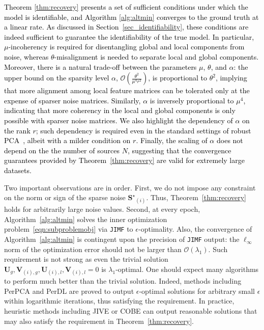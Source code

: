 \documentclass[twoside,11pt]{article}
\def\inneralg{\texttt{JIMF}\xspace}
\newcommand{\revise}[1]{\textcolor{black}{ #1}}
\newcommand{\matSst}{{\mathbf{S}^\star}}
\newcommand{\matU}{\mathbf{U}}
\newcommand{\matV}{\mathbf{V}}
\begin{document}
\revise{Theorem \ref{thm:recovery} presents a set of sufficient conditions under which the model is identifiable, and Algorithm \ref{alg:altmin} converges to the ground truth at a linear rate. As discussed in Section~\ref{sec_identifiability}, these conditions are indeed sufficient to guarantee the identifiability of the true model. In particular, $\mu$-incoherency is required for disentangling global and local components from noise, whereas $\theta$-misalignment is needed to separate local and global components. Moreover, there is a natural trade-off between the parameters $\mu$, $\theta$, and $\alpha$: the upper bound on the sparsity level $\alpha$, $ \mathcal{O}\left(\frac{\theta^2}{\mu^4r^2}\right)$, is proportional to $\theta^2$, implying that more alignment among local feature matrices can be tolerated only at the expense of sparser noise matrices. Similarly, $\alpha$ is inversely proportional to $\mu^4$, indicating that more coherency in the local and global components is only possible with sparser noise matrices. We also highlight the dependency of $\alpha$ on the rank $r$; such dependency is required even in the standard settings of robust PCA~\citep{nonconvexrobustpca, chandrasekaran2011rank, hsu2011robust}, albeit with a milder condition on $r$. Finally, the scaling of $\alpha$ does not depend on the the number of sources $N$, suggesting that the convergence guarantees provided by Theorem~\ref{thm:recovery} are valid for extremely large datasets.} 

Two important observations are in order. First, we do not impose any constraint on the norm or sign of the sparse noise $\matSst_{(i)}$. Thus, Theorem~\ref{thm:recovery} holds for arbitrarily large noise values. Second, at every epoch, Algorithm~\ref{alg:altmin} solves the inner optimization problem~\eqref{eqn:subproblemobj} via \inneralg to $\epsilon$-optimality. Also, the convergence of Algorithm~\ref{alg:altmin} is contingent upon the precision of \inneralg output: the $\ell_{\infty}$ norm of the optimization error should not be larger than $\mathcal{O}\left(\lambda_1\right)$. Such requirement is not strong as even the trivial solution $\matU_g,\matV_{(i),g},\matU_{(i),l},\matV_{(i),l}=0$ is $\lambda_1$-optimal. One should expect many algorithms to perform much better than the trivial solution. Indeed, methods including PerPCA and PerDL are proved to output $\epsilon$-optimal solutions for arbitrary small $\epsilon$ within logarithmic iterations, thus satisfying the requirement. In practice, heuristic methods including JIVE or COBE can output reasonable solutions that may also satisfy the requirement in Theorem~\ref{thm:recovery}. 
\end{document}
